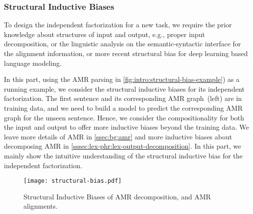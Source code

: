 {\subsubsection{Structural Inductive Biases}
\label{sssec:intro:structural-biases}
To design the independent factorization for a new task, we require the
prior knowledge about structures of input and output, e.g., proper
input decomposition, or the linguistic analysis on the
semantic-syntactic interface for the alignment information, or more
recent structural bias for deep learning based language modeling.

In this part, using the AMR parsing in
\autoref{fig:intro:structural-bias-example}) as a running example, we
consider the structural inductive biases for its independent
factorization. The first sentence and its corresponding AMR
graph~(left) are in training data, and we need to build a model to
predict the corresponding AMR graph for the unseen sentence. Hence, we
consider the compositionality for both the input and output to offer
more inductive biases beyond the training data. We leave more details
of AMR in \autoref{ssec:bg:amr} and more inductive biases about
decomposing AMR in
\autoref{sssec:lex-phr:lex-output-decomposition}. In this part, we
mainly show the intuitive understanding of the structural inductive
bias for the independent factorization.

\begin{figure}[!th]
  \centering
  \texttt{[image: structural-bias.pdf]}
  \caption{\label{fig:intro:structural-bias-example} Structural Inductive
    Biases of AMR decomposition, and AMR alignments.}
\end{figure}

}
